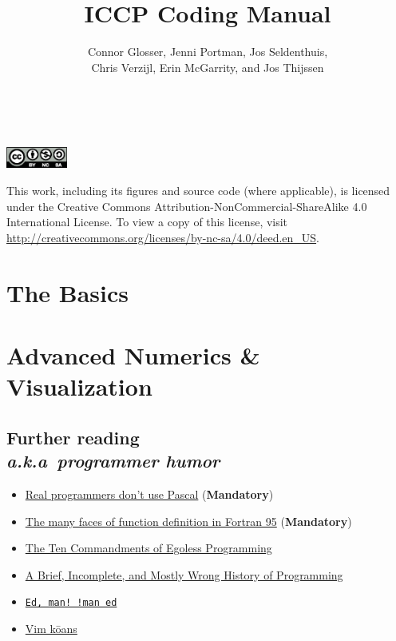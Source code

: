 \documentclass[nofonts, notoc, debug]{tufte-book}
\title{ICCP Coding Manual}
\author{Connor Glosser, Jenni Portman, Jos Seldenthuis, \\
        Chris Verzijl, Erin McGarrity, and Jos Thijssen}
\newcommand{\Chapter}[2]{\chapter[#1]{#1\\[-1.5ex]\Large\itshape#2}}
\begin{document}
\maketitle

\pagestyle{empty}
\newpage\
\null\
\vfill
\begin{fullwidth}
\begin{center}
  \includegraphics[width=0.15\textwidth]{figures/by-nc-sa.eps}

This work, including its figures and source code (where applicable), is
licensed under the Creative Commons Attribution-NonCommercial-ShareAlike 4.0
International License.  To view a copy of this license, visit
\url{http://creativecommons.org/licenses/by-nc-sa/4.0/deed.en_US}.
\end{center}
\end{fullwidth}
\pagestyle{fancy}

\tableofcontents


\mainmatter
\part{The Basics}






\part{Advanced Numerics \& Visualization}





\backmatter
\Chapter{Further reading}{a.k.a\ programmer humor}
\begin{itemize}
  \item \href{http://www.pbm.com/~lindahl/real.programmers.html}{Real programmers don't use Pascal} (\textbf{Mandatory})
  \item \href{https://gist.github.com/alanbriolat/3135713#file-fortran_hell-f95}{The many faces of function definition in Fortran 95} (\textbf{Mandatory})
  \item \href{http://www.codinghorror.com/blog/2006/05/the-ten-commandments-of-egoless-programming.html}{The Ten Commandments of Egoless Programming}
  \item \href{http://james-iry.blogspot.com/2009/05/brief-incomplete-and-mostly-wrong.html}{A Brief, Incomplete, and Mostly Wrong History of Programming}
  \item \href{https://www.gnu.org/fun/jokes/ed-msg.html}{\texttt{Ed, man! !man ed}}
  \item \href{http://blog.sanctum.geek.nz/vim-koans/}{Vim k\={o}ans}
\end{itemize}

\printindex
\end{document}
